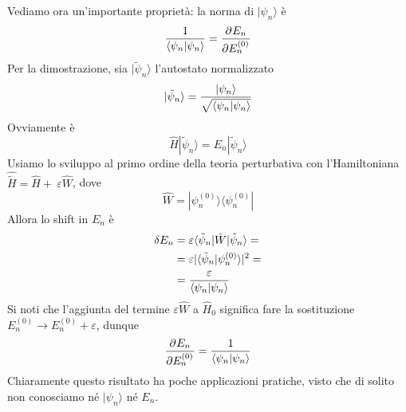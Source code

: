 \documentclass[a4paper, 11pt]{article}
\newcommand{\op}[1]{\hat{#1}}
\renewcommand{\op}[1]{\hat{#1}}
\newcommand{\ham}{\hat{H}}
\renewcommand{\ket}[1]{| #1\rangle}
\renewcommand{\bra}[1]{\langle #1|}
\begin{document}
Vediamo ora un'importante proprietà: la norma di $\ket{\psi_n}$ è
\[\frac{1}{\langle \psi_n\vert\psi_n\rangle}=\dfrac{\partial ^{}E_n}{\partial {E_n^{(0)}}^{}}\]
Per la dimostrazione, sia $\ket{\tilde{\psi}_n}$ l'autostato normalizzato
\[\ket{\tilde{\psi}_n}=\frac{\ket{\psi_n}}{\sqrt{\braket{\psi_n}{\psi_n}}}\]
Ovviamente è
\[\ham\ket{\tilde{\psi}_n}=E_n\ket{\tilde{\psi}_n}\]
Usiamo lo sviluppo al primo ordine della teoria perturbativa con l'Hamiltoniana $\op{\tilde{H}}=\ham+~\varepsilon\op W$, dove
\[\op W=\ket{\psi_n^{(0)}}\bra {\psi_n^{(0)}}\]
Allora lo shift in $E_n$ è
\begin{align*}\delta E_n&=\varepsilon\braketop{\tilde{\psi}_n}{\op W}{\tilde{\psi}_n}=\\&=\varepsilon|\braket{\tilde{\psi}_n}{\psi_n^{(0)}}|^2=\\&=\frac{\varepsilon}{\braket{\psi_n}{\psi_n}}\end{align*}
Si noti che l'aggiunta del termine $\varepsilon\op W$ a $\ham_0$ significa fare la sostituzione $E_n^{(0)}\to E_n^{(0)}+\varepsilon$, dunque
\[\dfrac{\partial ^{}E_n}{\partial {E_n^{(0)}}^{}}=\frac{1}{\langle \psi_n\vert\psi_n\rangle}\]
Chiaramente questo risultato ha poche applicazioni pratiche, visto che di solito non conosciamo né $\ket{\psi_n}$ né $E_n$.
\end{document}
